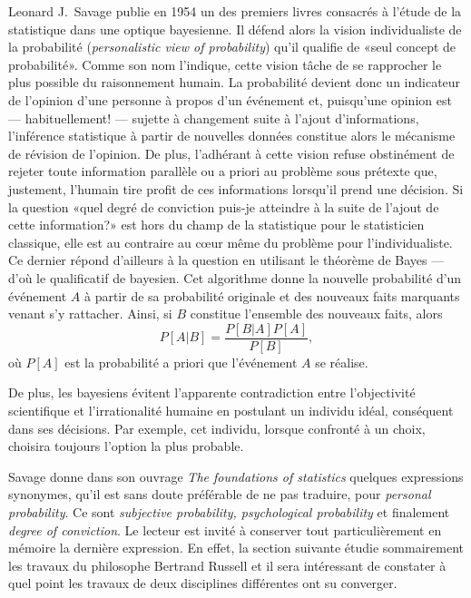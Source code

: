 Leonard J.\ Savage publie en 1954 \citep{Savage:foundations:1954} un des premiers
livres consacrés à l'étude de la statistique dans une optique
bayesienne. Il défend alors la vision individualiste de la probabilité
(\emph{personalistic view of probability}) qu'il qualifie de «seul
concept de probabilité». Comme son nom l'indique, cette vision tâche
de se rapprocher le plus possible du raisonnement humain.  La
probabilité devient donc un indicateur de l'opinion d'une personne à
propos d'un événement et, puisqu'une opinion est --- habituellement!
--- sujette à changement suite à l'ajout d'informations, l'inférence
statistique à partir de nouvelles données constitue alors le mécanisme
de révision de l'opinion. De plus, l'adhérant à cette vision refuse
obstinément de rejeter toute information parallèle ou a priori au
problème sous prétexte que, justement, l'humain tire profit de ces
informations lorsqu'il prend une décision. Si la question «quel degré
de conviction puis-je atteindre à la suite de l'ajout de cette information?»
est hors du champ de la statistique pour le statisticien classique,
elle est au contraire au c{\oe}ur même du problème pour
l'individualiste.  Ce dernier répond d'ailleurs à la question en
utilisant le théorème de Bayes --- d'où le qualificatif de bayesien.
Cet algorithme donne la nouvelle probabilité d'un événement $A$ à
partir de sa probabilité originale et des nouveaux faits marquants
venant s'y rattacher. Ainsi, si $B$ constitue l'ensemble des nouveaux
faits, alors
\begin{equation*}
  P[A|B]= \frac{P[B|A]P[A]}{P[B]},
\end{equation*}
où $P[A]$ est la probabilité a priori que l'événement $A$ se réalise.

De plus, les bayesiens évitent l'apparente contradiction entre
l'objectivité scientifique et l'irrationalité humaine en postulant un
individu idéal, conséquent dans ses décisions. Par exemple, cet
individu, lorsque confronté à un choix, choisira toujours l'option la
plus probable.

Savage donne dans son ouvrage \emph{The foundations of statistics}
\citeyearpar{Savage:foundations:1954} quelques expressions synonymes,
qu'il est sans doute préférable de ne pas traduire, pour
\emph{personal probability}. Ce sont \emph{subjective probability,
  psychological probability} et finalement \emph{degree of
  conviction}. Le lecteur est invité à conserver tout particulièrement
en mémoire la dernière expression. En effet, la section suivante
étudie sommairement les travaux du philosophe Bertrand Russell et il
sera intéressant de constater à quel point les travaux de deux
disciplines différentes ont su converger.

